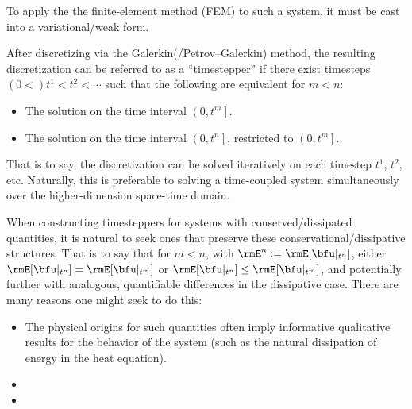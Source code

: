     To apply the the finite-element method (FEM) to such a system, it must be cast into a variational/weak form.
    
    After discretizing via the Galerkin(/Petrov--Galerkin) method, the resulting discretization can be referred to as a ``timestepper'' if there exist timesteps $(0  <)  t^{1}  <  t^{2}  <  \cdots$ such that the following are equivalent for $m  <  n$:
    \begin{itemize}
        \item  The solution on the time interval $\left(0, t^{m}\right]$.
        \item  The solution on the time interval $\left(0, t^{n}\right]$, restricted to $\left(0, t^{m}\right]$.
    \end{itemize}
    That is to say, the discretization can be solved iteratively on each timestep $t^{1}$, $t^{2}$, etc. Naturally, this is preferable to solving a time-coupled system simultaneously over the higher-dimension space-time domain.
    
    When constructing timesteppers for systems with conserved/dissipated quantities, it is natural to seek ones that preserve these conservational/dissipative structures. That is to say that for $m  <  n$, with $\rmE^{n}  :=  \rmE[\bfu|_{t^{n}}]$, either $\rmE[\bfu|_{t^{n}}]  =  \rmE[\bfu|_{t^{m}}]$ or $\rmE[\bfu|_{t^{n}}]  \leq  \rmE[\bfu|_{t^{m}}]$, and potentially further with analogous, quantifiable differences in the dissipative case. There are many reasons one might seek to do this:
    \begin{itemize}
        \item  The physical origins for such quantities often imply informative qualitative results for the behavior of the system (such as the natural dissipation of energy in the heat equation). 
        \item  {}
        \item  {}
    \end{itemize}


    
    
